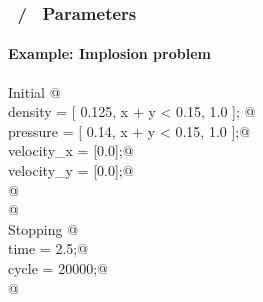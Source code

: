 \begin{frame}[fragile] 
\frametitle{\enzop\ / \cello\ Parameters}
\framesubtitle{Example: Implosion problem}
\begin{block}{}\footnotesize
{}  \verb@    Initial {@ \\
  \verb@       density  = [ 0.125, x + y < 0.15, 1.0 ];  @ \\
  \verb@       pressure = [ 0.14,  x + y < 0.15, 1.0 ];@ \\
  \verb@       velocity_x = [0.0];@ \\
  \verb@       velocity_y = [0.0];@ \\
  \verb@    }@ \\
  \verb@ @ \\
  \verb@    Stopping {@ \\
  \verb@       time  = 2.5;@ \\
  \verb@       cycle = 20000;@ \\
  \verb@    }@ \\
\end{block}
\end{frame}

